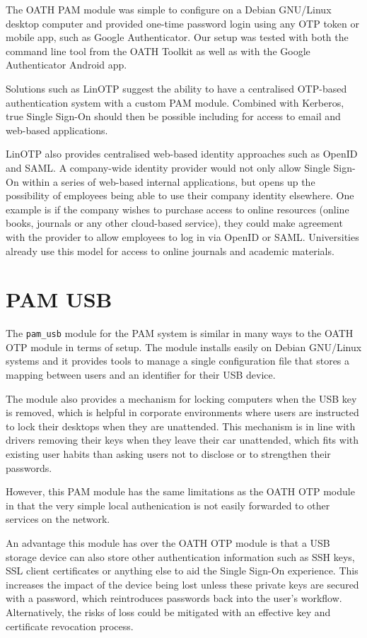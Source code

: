 \documentclass{report}
\begin{document}
The OATH PAM module was simple to configure on a Debian GNU/Linux desktop
computer and provided one-time password login using any OTP token or mobile
app, such as Google Authenticator. Our setup was tested with both the
command line tool from the OATH Toolkit as well as with the
Google Authenticator Android app.

Solutions such as LinOTP suggest the ability to have a centralised
OTP-based authentication system with a custom PAM module. Combined
with Kerberos, true Single Sign-On should then be possible
including for access to email and web-based applications.

LinOTP also provides centralised web-based identity approaches
such as OpenID and SAML. A company-wide identity provider would
not only allow Single Sign-On within a series of web-based
internal applications, but opens up the possibility of employees
being able to use their company identity elsewhere. One example
is if the company wishes to purchase access to online resources
(online books, journals or any other cloud-based service), they
could make agreement with the provider to allow employees to log in
via OpenID or SAML. Universities already use this model for access to online
journals and academic materials.

\section{PAM USB}

The \texttt{pam\_usb} module for the PAM system is similar in many
ways to the OATH OTP module in terms of setup. The module
installs easily on Debian GNU/Linux systems and it provides
tools to manage a single configuration file that stores a
mapping between users and an identifier for their USB device.

The module also provides a mechanism for locking computers
when the USB key is removed, which is helpful in corporate
environments where users are instructed to lock their desktops
when they are unattended. This mechanism is in line with
drivers removing their keys when they leave their car
unattended, which fits with existing user
habits than asking users not to disclose or to strengthen
their passwords.

However, this PAM module has the same limitations as the
OATH OTP module in that the very simple local authenication
is not easily forwarded to other services on the network.

An advantage this module has over the OATH OTP module is that
a USB storage device can also store other authentication
information such as SSH keys, SSL client certificates or
anything else to aid the Single Sign-On experience. This
increases the impact of the device being lost unless
these private keys are secured with a password, which
reintroduces passwords back into the user's workflow. Alternatively,
the risks of loss could be mitigated with an effective
key and certificate revocation process.
\end{document}
